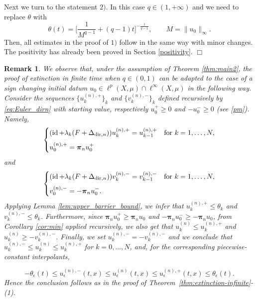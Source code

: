 \documentclass[journal]{article}
\theoremstyle{nonitalic}
\theoremstyle{nonitalic}
\newtheorem{remark}[theorem]{Remark}
\theoremstyle{plain} %
\numberwithin{equation}{section}
\begin{document}
Next we turn to the statement $2)$. In this case $q\in(1,+\infty)$ and we need to replace $\theta$ with 
$$
\theta(t) = \bigl[\frac{1}{M^{q-1}}+(q-1)t\bigr]^{-\frac1{q-1}}, \qquad M = \|u_0\|_\infty.
$$
Then, all estimates in the proof of $1)$ follow in the same way with minor changes. The positivity has already been proved in Section \ref{positivity}. $\Box$

\begin{remark}\label{rem:caso_con_segno}
We observe that, under the assumption of Theorem \ref{thm:main2}, the proof of extinction in finite time when $q\in(0,1)$ can be adapted to the case of a sign changing initial datum $u_0 \in \ell^p(X,\mu)\cap \ell^\infty(X,\mu)$  in the following way. Consider the sequences $\{u_k^{(n),+}\}_k$ and $\{v_k^{(n),-}\}_k$ defined recursively by \eqref{eq:Euler_dirn} with starting value, respectively $u_0^+\geq 0$ and $-u_0^- \geq 0$ (see \eqref{pm}). Namely,
\begin{equation}\label{eq:Euler_dirn+}
\begin{cases}
   (\operatorname{id} + \lambda_k (F + \Delta_{\textnormal{dir}, n}))u_k^{(n),+}  = u_{k-1}^{(n),+} & \text{for } k = 1,\dots,N,\\[6pt]
   u^{(n),+}_0 = \boldsymbol{\pi}_n u_0^+ 
\end{cases}
\end{equation}
and
\begin{equation}\label{eq:Euler_dirn-}
\begin{cases}
   (\operatorname{id} + \lambda_k (F + \Delta_{\textnormal{dir}, n}))v_k^{(n),-}  = v_{k-1}^{(n),-} & \text{for } k = 1,\dots,N,\\[6pt]
   v^{(n),-}_0 =- \boldsymbol{\pi}_n u_0^-.
\end{cases}
\end{equation} 
Applying Lemma \ref{lem:upper_barrier_bound}, we infer that $u_{k}^{(n),+}\leq \theta_k$ and $v_{k}^{(n),-}\leq \theta_k$. Furthermore, since $\boldsymbol{\pi}_n u_0^{+} \geq \boldsymbol{\pi}_n u_0$ and $-\boldsymbol{\pi}_n u_0^{-} \geq -\boldsymbol{\pi}_n u_0$, from Corollary \ref{cor:min} applied recursively, we also get that $u_{k}^{(n)} \leq u_{k}^{(n),+}$ and $u_{k}^{(n)} \geq - v_{k}^{(n),-}$. Finally, we set $u_{k}^{(n),-}=-v_{k}^{(n),-}$ and we conclude that $u_{k}^{(n),-} \leq u_{k}^{(n)} \leq u_{k}^{(n),+}$ for $k=0, \ldots, N$, and, for the corresponding piecewise-constant interpolants,

$$-\theta_\epsilon(t) \leq u_\epsilon^{(n),-} (t,x) \leq   u_\epsilon^{(n)} (t,x) \leq u_\epsilon^{(n),+} (t,x)  \leq \theta_\epsilon(t).$$ 
Hence the conclusion follows as in the proof of Theorem~\ref{thm:extinction-infinite}-(1). 

\end{remark}
\end{document}
